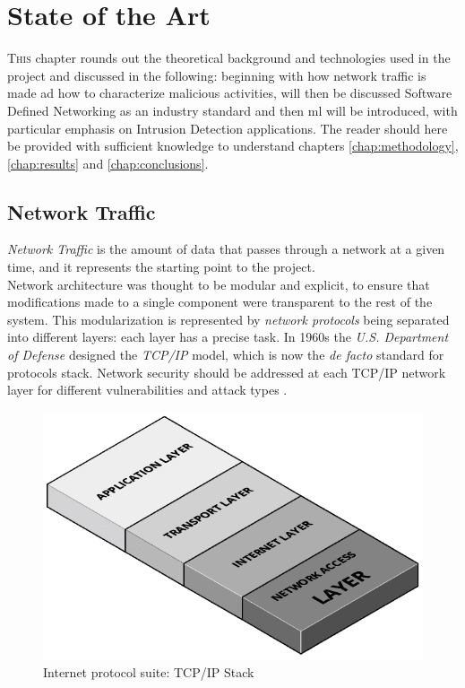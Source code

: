 \chapter{State of the Art}
\label{chap:state-of-the-art}

\lettrine[lines=3, findent=3pt, nindent=0pt]{T}{his} chapter rounds out the theoretical background and technologies used in the project and discussed in the following: beginning with how network traffic is made ad how to characterize malicious activities, will then be discussed Software Defined Networking as an industry standard and then \gls{ml} will be introduced, with particular emphasis on Intrusion Detection applications. The reader should here be provided with sufficient knowledge to understand chapters \ref{chap:methodology}, \ref{chap:results} and \ref{chap:conclusions}.


\section{Network Traffic}
\label{sec:network-traffic}

\textit{Network Traffic} is the amount of data that passes through a network at a given time, and it represents the starting point to the project. \\ Network architecture was thought to be modular and explicit, to ensure that modifications made to a single component were transparent to the rest of the system. This modularization is represented by \textit{network protocols} being separated into different layers: each layer has a precise task. In 1960s the \textit{U.S. Department of Defense} designed the \textit{TCP/IP} model, which is now the \textit{de facto} standard for protocols stack. Network security should be addressed at each TCP/IP network layer for different vulnerabilities and attack types \cite{Zaman2009}.

\begin{figure}[h!]
    \centering
    \includegraphics[scale=0.3]{assets/figures/chapter2/TCP_IP Stack.png}
    \caption{Internet protocol suite: TCP/IP Stack}
    \label{fig:TCP/IP-stack}
\end{figure}


